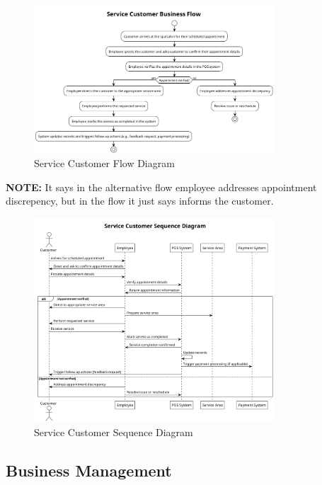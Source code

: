 \documentclass[]{VUMIFTemplateClass}
\newcommand{\noticecomment}[1]{%
    \begin{tcolorbox}[colback=blue!20, colframe=blue!60, arc=0pt, outer arc=0pt, boxrule=1pt, left=3pt, right=3pt, top=3pt, bottom=3pt]
        \textbf{\textcolor{blue!70!black}{NOTE:}} #1
    \end{tcolorbox}
}
\begin{document}
\begin{figure}[H]
    \centering
    \includegraphics[width=0.8\textwidth]{images/diagrams/services/service_customer_flow.png}
    \caption{Service Customer Flow Diagram}
    \label{fig:service_customer_flow}
\end{figure}

\noticecomment{It says in the alternative flow employee addresses appointment discrepency, but in the flow it just says informs the customer. }

\begin{figure}[H]
    \centering
    \includegraphics[width=0.8\textwidth]{images/diagrams/services/service_customer_sequence.png}
    \caption{Service Customer Sequence Diagram}
    \label{fig:service_customer_sequence}
\end{figure}

\subsection{Business Management}
\end{document}
